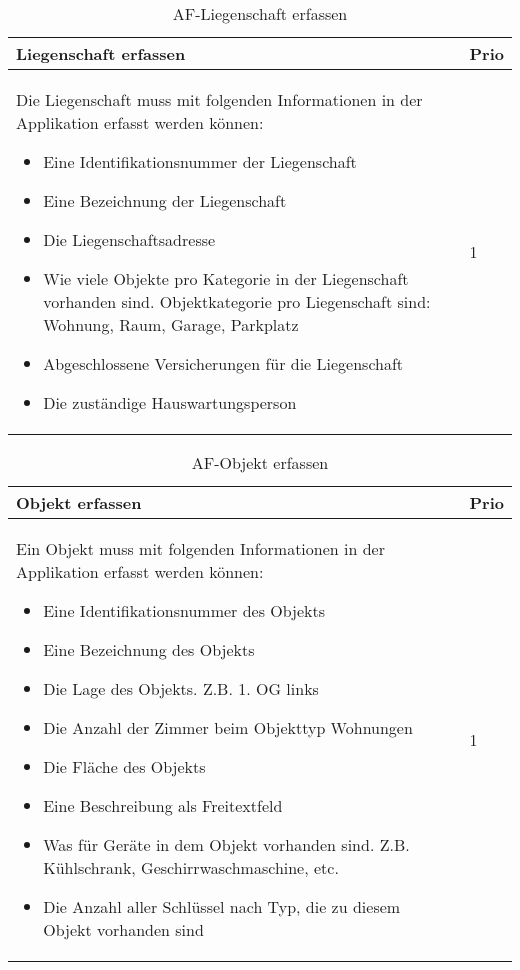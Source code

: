 \begin{table}[H]
  \centering
  \settowidth{}
  \setlength\extrarowheight{2pt}
  \begin{tabulary}{1.0\textwidth}{|m{16cm}|L|}
    \hline
    \textbf{Liegenschaft erfassen}&\textbf{Prio}\\
    \hline
    Die Liegenschaft muss mit folgenden Informationen in der Applikation erfasst werden können:
    \begin{itemize}
      \item Eine Identifikationsnummer der Liegenschaft
      \item Eine Bezeichnung der Liegenschaft
      \item Die Liegenschaftsadresse
      \item Wie viele Objekte pro Kategorie in der Liegenschaft vorhanden sind. Objektkategorie pro Liegenschaft sind: Wohnung, Raum, Garage, Parkplatz
      \item Abgeschlossene Versicherungen für die Liegenschaft
      \item Die zuständige Hauswartungsperson
    \end{itemize} & 1\\ 
    \hline
  \end{tabulary}
  \caption{AF-Liegenschaft erfassen}
  \label{afLiegenschaftErfassen}
\end{table}

\begin{table}[H]
  \centering
  \settowidth{}
  \setlength\extrarowheight{2pt}
  \begin{tabulary}{1.0\textwidth}{|m{16cm}|L|}
    \hline
    \textbf{Objekt erfassen}&\textbf{Prio}\\
    \hline
    Ein Objekt muss mit folgenden Informationen in der Applikation erfasst werden können:
    \begin{itemize}
      \item Eine Identifikationsnummer des Objekts
      \item Eine Bezeichnung des Objekts
      \item Die Lage des Objekts. Z.B. 1. OG links
      \item Die Anzahl der Zimmer beim Objekttyp Wohnungen
      \item Die Fläche des Objekts
      \item Eine Beschreibung als Freitextfeld
      \item Was für Geräte in dem Objekt vorhanden sind. Z.B. Kühlschrank, Geschirrwaschmaschine, etc.
      \item Die Anzahl aller Schlüssel nach Typ, die zu diesem Objekt vorhanden sind 
    \end{itemize} & 1\\ 
    \hline
  \end{tabulary}
  \caption{AF-Objekt erfassen}
  \label{afObjektErfassen}
\end{table}

